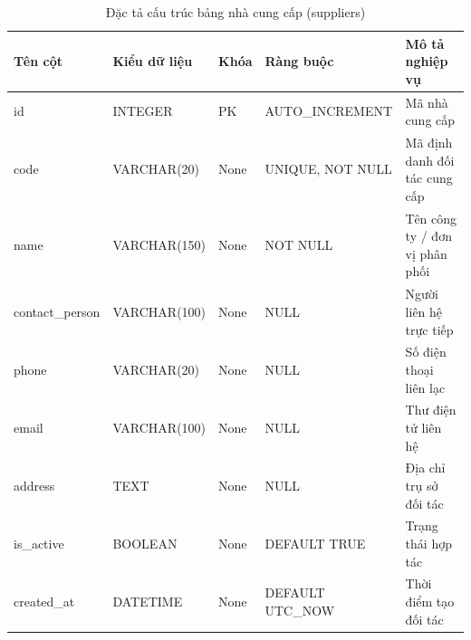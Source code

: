 \begin{table}[h!]
\centering
\caption{Đặc tả cấu trúc bảng nhà cung cấp (suppliers)}
\begin{tabular}{|l|l|l|l|l|}
\hline
\rowcolor{tablehead}
\textbf{Tên cột} & \textbf{Kiểu dữ liệu} & \textbf{Khóa} & \textbf{Ràng buộc} & \textbf{Mô tả nghiệp vụ} \\ \hline
id & INTEGER & PK & AUTO\_INCREMENT & Mã nhà cung cấp \\ \hline
code & VARCHAR(20) & None & UNIQUE, NOT NULL & Mã định danh đối tác cung cấp \\ \hline
name & VARCHAR(150) & None & NOT NULL & Tên công ty / đơn vị phân phối \\ \hline
contact\_person & VARCHAR(100) & None & NULL & Người liên hệ trực tiếp \\ \hline
phone & VARCHAR(20) & None & NULL & Số điện thoại liên lạc \\ \hline
email & VARCHAR(100) & None & NULL & Thư điện tử liên hệ \\ \hline
address & TEXT & None & NULL & Địa chỉ trụ sở đối tác \\ \hline
is\_active & BOOLEAN & None & DEFAULT TRUE & Trạng thái hợp tác \\ \hline
created\_at & DATETIME & None & DEFAULT UTC\_NOW & Thời điểm tạo đối tác \\ \hline
\end{tabular}
\end{table}

